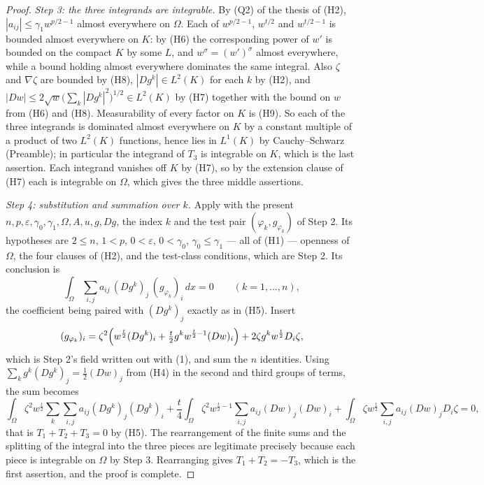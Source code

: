 \begin{proof}
\emph{Step 3: the three integrands are integrable.}  By (Q2) of the thesis of (H2),
$|a_{ij}|\le\gamma_1w^{p/2-1}$ almost everywhere on $\Omega$.  Each of
$w^{p/2-1}$, $w^{t/2}$ and $w^{t/2-1}$ is bounded almost everywhere on $K$: by
(H6) the corresponding power of $w'$ is bounded on the compact $K$ by some
$L$, and $w^\sigma=(w')^\sigma$ almost everywhere, while a bound holding almost
everywhere dominates the same integral.  Also $\zeta$ and $\nabla\zeta$ are
bounded by (H8), $|Dg^k|\in L^2(K)$ for each $k$ by (H2), and
$|Dw|\le2\sqrt w\bigl(\sum_k|Dg^k|^2\bigr)^{1/2}\in L^2(K)$ by (H7) together
with the bound on $w$ from (H6) and (H8).  Measurability of every factor on $K$
is (H9).  So each of the three integrands is dominated almost everywhere on $K$
by a constant multiple of a product of two $L^2(K)$ functions, hence lies in
$L^1(K)$ by Cauchy--Schwarz (Preamble); in particular the integrand of $T_3$ is
integrable on $K$, which is the last assertion.  Each integrand vanishes off
$K$ by (H7), so by the extension clause of (H7) each is integrable on $\Omega$,
which gives the three middle assertions.

\emph{Step 4: substitution and summation over $k$.}  Apply
 with the present
$n,p,\varepsilon,\gamma_0,\gamma_1,\Omega,A,u,g,Dg$, the index $k$ and the test
pair $(\varphi_k,g_{\varphi_k})$ of Step 2.  Its hypotheses are $2\le n$,
$1<p$, $0<\varepsilon$, $0<\gamma_0$, $\gamma_0\le\gamma_1$ --- all of (H1) ---
openness of $\Omega$, the four clauses of (H2), and the test-class conditions,
which are Step 2.  Its conclusion is
\[
\int_\Omega\sum_{i,j}a_{ij}\,(Dg^k)_j\,(g_{\varphi_k})_i\,dx=0
\qquad(k=1,\dots,n),
\]
the coefficient being paired with $(Dg^k)_j$ exactly as in (H5).  Insert
\[
(g_{\varphi_k})_i=\zeta^2\Bigl(w^{\frac t2}(Dg^k)_i
+\tfrac t2g^kw^{\frac t2-1}(Dw)_i\Bigr)+2\zeta g^kw^{\frac t2}D_i\zeta ,
\]
which is Step 2's field written out with (1), and sum the $n$ identities.  Using
$\sum_kg^k(Dg^k)_j=\tfrac12(Dw)_j$ from (H4) in the second and third groups of
terms, the sum becomes
\[
\int_\Omega\zeta^2w^{\frac t2}\sum_k\sum_{i,j}a_{ij}(Dg^k)_j(Dg^k)_i
+\frac t4\int_\Omega\zeta^2w^{\frac t2-1}\sum_{i,j}a_{ij}(Dw)_j(Dw)_i
+\int_\Omega\zeta w^{\frac t2}\sum_{i,j}a_{ij}(Dw)_jD_i\zeta=0 ,
\]
that is $T_1+T_2+T_3=0$ by (H5).  The rearrangement of the finite sums and the
splitting of the integral into the three pieces are legitimate precisely because
each piece is integrable on $\Omega$ by Step 3.  Rearranging gives
$T_1+T_2=-T_3$, which is the first assertion, and the proof is complete.
\end{proof}
